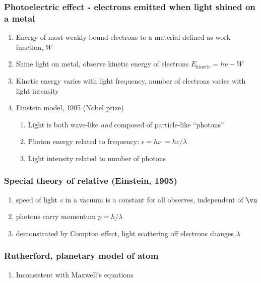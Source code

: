 \documentclass[11pt]{article}
\begin{document}
\subsubsection{Photoelectric effect - electrons emitted when light shined on a metal}
\label{sec:orgb614151}
\begin{enumerate}
\item Energy of most weakly bound electrons to a material defined as work function, \(W\)
\item Shine light on metal, observe kinetic energy of electrons \(E_\text{kinetic}=h\nu -W\)
\item Kinetic energy varies with light frequency, number of electrons varies with light intensity
\item Einstein model, 1905 (Nobel prize)
\begin{enumerate}
\item Light is both wave-like \emph{and} composed of particle-like ``photons''
\item Photon energy related to frequency: \(\epsilon = h \nu\ = hc/\lambda\)
\item Light intensity related to number of photons
\end{enumerate}
\end{enumerate}
\subsubsection{Special theory of relative (Einstein, 1905)}
\label{sec:orgd42027d}
\begin{enumerate}
\item speed of light \emph{c} in a vacuum is a constant for all observes, independent of \(\vu\)
\item photons carry momentum  \(p=h/\lambda\)
\item demonstrated by Compton effect, light scattering off electrons changes \(\lambda\)
\end{enumerate}
\subsubsection{Rutherford, planetary model of atom}
\label{sec:orgeb0e9c9}
\begin{enumerate}
\item Inconsistent with Maxwell's equations
\end{enumerate}
\end{document}
